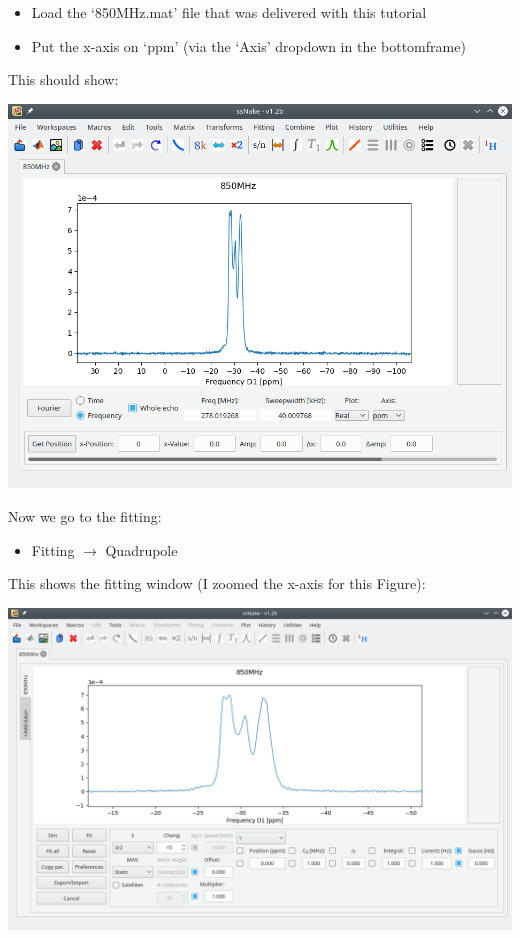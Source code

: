 \documentclass[11pt,a4paper]{article}
\begin{document}
\begin{itemize}
  \item Load the `850MHz.mat' file that was delivered with this tutorial
  \item Put the x-axis on `ppm' (via the `Axis' dropdown in the bottomframe)
\end{itemize}
This should show:
\begin{center}
\includegraphics[width=0.8\linewidth]{Figs/Fig1.png}
\end{center}

Now we go to the fitting:

\begin{itemize}
  \item Fitting $\longrightarrow$ Quadrupole
\end{itemize}
This shows the fitting window (I zoomed the x-axis for this Figure):

\begin{center}
\includegraphics[width=1.0\linewidth]{Figs/Fig2.png}
\end{center}
\end{document}
